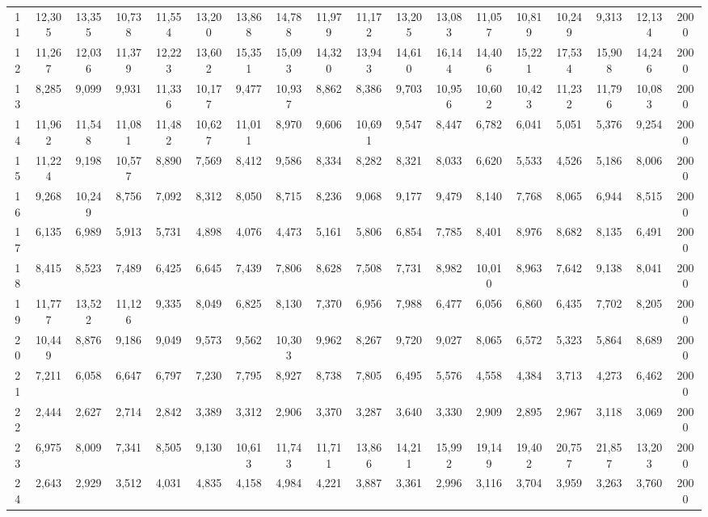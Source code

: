 {\begin{longtable}{ >{\tiny}cccccccccccccccccc}
11  & 12,305 & 13,355 & 10,738 & 11,554 & 13,200 & 13,868 & 14,788 & 11,979 & 11,172 & 13,205 & 13,083 & 11,057 & 10,819 & 10,249 & 9,313  & 12,134 & 2000 \\
12  & 11,267 & 12,036 & 11,379 & 12,223 & 13,602 & 15,351 & 15,093 & 14,320 & 13,943 & 14,610 & 16,144 & 14,406 & 15,221 & 17,534 & 15,908 & 14,246 & 2000 \\
13  & 8,285  & 9,099  & 9,931  & 11,336 & 10,177 & 9,477  & 10,937 & 8,862  & 8,386  & 9,703  & 10,956 & 10,602 & 10,423 & 11,232 & 11,796 & 10,083 & 2000 \\
14  & 11,962 & 11,548 & 11,081 & 11,482 & 10,627 & 11,011 & 8,970  & 9,606  & 10,691 & 9,547  & 8,447  & 6,782  & 6,041  & 5,051  & 5,376  & 9,254  & 2000 \\
15  & 11,224 & 9,198  & 10,577 & 8,890  & 7,569  & 8,412  & 9,586  & 8,334  & 8,282  & 8,321  & 8,033  & 6,620  & 5,533  & 4,526  & 5,186  & 8,006  & 2000 \\
16  & 9,268  & 10,249 & 8,756  & 7,092  & 8,312  & 8,050  & 8,715  & 8,236  & 9,068  & 9,177  & 9,479  & 8,140  & 7,768  & 8,065  & 6,944  & 8,515  & 2000 \\
17  & 6,135  & 6,989  & 5,913  & 5,731  & 4,898  & 4,076  & 4,473  & 5,161  & 5,806  & 6,854  & 7,785  & 8,401  & 8,976  & 8,682  & 8,135  & 6,491  & 2000 \\
18  & 8,415  & 8,523  & 7,489  & 6,425  & 6,645  & 7,439  & 7,806  & 8,628  & 7,508  & 7,731  & 8,982  & 10,010 & 8,963  & 7,642  & 9,138  & 8,041  & 2000 \\
19  & 11,777 & 13,522 & 11,126 & 9,335  & 8,049  & 6,825  & 8,130  & 7,370  & 6,956  & 7,988  & 6,477  & 6,056  & 6,860  & 6,435  & 7,702  & 8,205  & 2000 \\
20  & 10,449 & 8,876  & 9,186  & 9,049  & 9,573  & 9,562  & 10,303 & 9,962  & 8,267  & 9,720  & 9,027  & 8,065  & 6,572  & 5,323  & 5,864  & 8,689  & 2000 \\
21  & 7,211  & 6,058  & 6,647  & 6,797  & 7,230  & 7,795  & 8,927  & 8,738  & 7,805  & 6,495  & 5,576  & 4,558  & 4,384  & 3,713  & 4,273  & 6,462  & 2000 \\
22  & 2,444  & 2,627  & 2,714  & 2,842  & 3,389  & 3,312  & 2,906  & 3,370  & 3,287  & 3,640  & 3,330  & 2,909  & 2,895  & 2,967  & 3,118  & 3,069  & 2000 \\
23  & 6,975  & 8,009  & 7,341  & 8,505  & 9,130  & 10,613 & 11,743 & 11,711 & 13,866 & 14,211 & 15,992 & 19,149 & 19,402 & 20,757 & 21,857 & 13,203 & 2000 \\
24  & 2,643  & 2,929  & 3,512  & 4,031  & 4,835  & 4,158  & 4,984  & 4,221  & 3,887  & 3,361  & 2,996  & 3,116  & 3,704  & 3,959  & 3,263  & 3,760  & 2000 \\

\end{longtable}}
